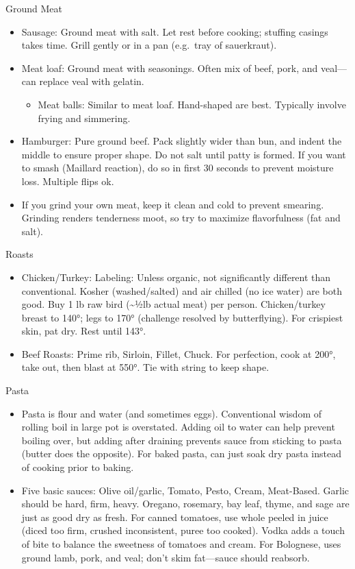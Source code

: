 \documentclass[
]{article}
\providecommand{\tightlist}{%
  \setlength{\itemsep}{0pt}\setlength{\parskip}{0pt}}
\begin{document}
Ground Meat

\begin{itemize}
\item
  Sausage: Ground meat with salt. Let rest before cooking; stuffing
  casings takes time. Grill gently or in a pan (e.g.~tray of
  sauerkraut).
\item
  Meat loaf: Ground meat with seasonings. Often mix of beef, pork, and
  veal---can replace veal with gelatin.

  \begin{itemize}
  \tightlist
  \item
    Meat balls: Similar to meat loaf. Hand-shaped are best. Typically
    involve frying and simmering.
  \end{itemize}
\item
  Hamburger: Pure ground beef. Pack slightly wider than bun, and indent
  the middle to ensure proper shape. Do not salt until patty is formed.
  If you want to smash (Maillard reaction), do so in first 30 seconds to
  prevent moisture loss. Multiple flips ok.
\item
  If you grind your own meat, keep it clean and cold to prevent
  smearing. Grinding renders tenderness moot, so try to maximize
  flavorfulness (fat and salt).
\end{itemize}

Roasts

\begin{itemize}
\item
  Chicken/Turkey: Labeling: Unless organic, not significantly different
  than conventional. Kosher (washed/salted) and air chilled (no ice
  water) are both good. Buy 1 lb raw bird (\textasciitilde½lb actual
  meat) per person. Chicken/turkey breast to 140°; legs to 170°
  (challenge resolved by butterflying). For crispiest skin, pat dry.
  Rest until 143°.
\item
  Beef Roasts: Prime rib, Sirloin, Fillet, Chuck. For perfection, cook
  at 200°, take out, then blast at 550°. Tie with string to keep shape.
\end{itemize}

Pasta

\begin{itemize}
\item
  Pasta is flour and water (and sometimes eggs). Conventional wisdom of
  rolling boil in large pot is overstated. Adding oil to water can help
  prevent boiling over, but adding after draining prevents sauce from
  sticking to pasta (butter does the opposite). For baked pasta, can
  just soak dry pasta instead of cooking prior to baking.
\item
  Five basic sauces: Olive oil/garlic, Tomato, Pesto, Cream, Meat-Based.
  Garlic should be hard, firm, heavy. Oregano, rosemary, bay leaf,
  thyme, and sage are just as good dry as fresh. For canned tomatoes,
  use whole peeled in juice (diced too firm, crushed inconsistent, puree
  too cooked). Vodka adds a touch of bite to balance the sweetness of
  tomatoes and cream. For Bolognese, uses ground lamb, pork, and veal;
  don't skim fat---sauce should reabsorb.
\end{itemize}
\end{document}
